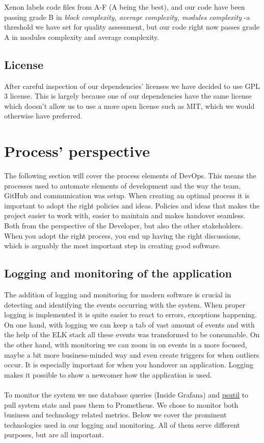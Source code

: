 \documentclass[12pt]{article}
\begin{document}
Xenon labels code files from A-F (A being the best), and our code have been passing grade B in \textit{block complexity, average complexity, modules complexity} -a threshold we have set for quality assessment, but our code right now passes grade A in modules complexity and average complexity.

\subsection{License}
After careful inspection of our dependencies' licenses we have decided to use GPL 3 license. This is largely because one of our dependencies have the same license which doesn't allow us to use a more open license such as MIT, which we would otherwise have preferred.


\section{Process' perspective}
The following section will cover the process elements of DevOps. This means the processes used to automate elements of development and the way the team, GitHub and communication was setup. When creating an optimal process it is important to adopt the right policies and ideas. Policies and ideas that makes the project easier to work with, easier to maintain and makes handover seamless. Both from the perspective of the Developer, but also the other stakeholders. When you adopt the right process, you end up having the right discussions, which is arguably the most important step in creating good software.

\subsection{Logging and monitoring of the application}
The addition of logging and monitoring for modern software is crucial in detecting and identifying the events occurring with the system. When proper logging is implemented it is quite easier to react to errors, exceptions happening. On one hand, with logging we can keep a tab of vast amount of events and with the help of the ELK stack all these events was transformed to be consumable. On the other hand, with monitoring we can zoom in on events in a more focused, maybe a bit more business-minded way and even create triggers for when outliers occur. It is especially important for when you handover an application. Logging makes it possible to show a newcomer how the application is used.
\\\\
To monitor the system we use database queries (Inside Grafana) and \href{https://github.com/giampaolo/psutil}{psutil} to pull system stats and pass them to Prometheus. We chose to monitor both business and technology related metrics. Below we cover the prominent technologies used in our logging and monitoring. All of them serve different purposes, but are all important.
\end{document}
